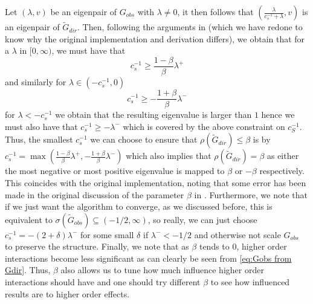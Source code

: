 \documentclass[../Thesis.tex]{subfiles}
\begin{document}
Let $\left(\lambda, v\right)$ be an eigenpair of $G_{obs}$ with $\lambda \neq 0$, it then follows that $\left(\frac{\lambda}{c_s^{-1} + \lambda}, v\right)$ is an eigenpair of $\tilde{G}_{dir}$. Then, following the arguments in \cite{Network-deconvolution-as-a-general-method-to-distinguish-direct-dependencies-in-networks} (which we have redone to know why the original implementation and derivation differs), we obtain that for a $\lambda$ in $[0,\infty)$, we must have that
$$c_s^{-1}  \geq \frac{1-\beta}{\beta} \lambda^+$$
and similarly for $\lambda \in (-c_s^{-1},0)$
$$c_s^{-1}  \geq -\frac{1+\beta}{\beta} \lambda^-$$
for $\lambda < -c_s^{-1}$ we obtain that the resulting eigenvalue is larger than $1$ hence we must also have that $c_s^{-1} \geq - \lambda^{-}$ which is covered by the above constraint on $c_S^{-1}$. Thus, the smallest $c_s^{-1}$ we can choose to ensure that $\rho\left(\tilde{G}_{dir}\right) \leq \beta$ is by $c_s^{-1} = \max \left(\frac{1-\beta}{\beta} \lambda^+,-\frac{1+\beta}{\beta} \lambda^- \right)$ which also implies that $\rho\left(\tilde{G}_{dir}\right) = \beta$ as either the most negative or most positive eigenvalue is mapped to $\beta$ or $-\beta$ respectively. This coincides with the original implementation, noting that some error has been made in the original discussion of the parameter $\beta$ in \cite{Network-deconvolution-as-a-general-method-to-distinguish-direct-dependencies-in-networks}. Furthermore, we note that if we just want the algorithm to converge, as we discussed before, this is equivalent to $\sigma\left(\tilde{G}_{obs}\right) \subseteq (-1/2, \infty)$, so really, we can just choose $c_s^{-1} = -(2+\delta) \lambda^-$ for some small $\delta$ if $\lambda^- < -1/2$ and otherwise not scale $G_{obs}$ to preserve the structure. Finally, we note that as $\beta$ tends to $0$, higher order interactions become less significant as can clearly be seen from \autoref{eq:Gobs from Gdir}. Thus, $\beta$ also allows us to tune how much influence higher order interactions should have and one should try different $\beta$ to see how influenced results are to higher order effects.
\end{document}
